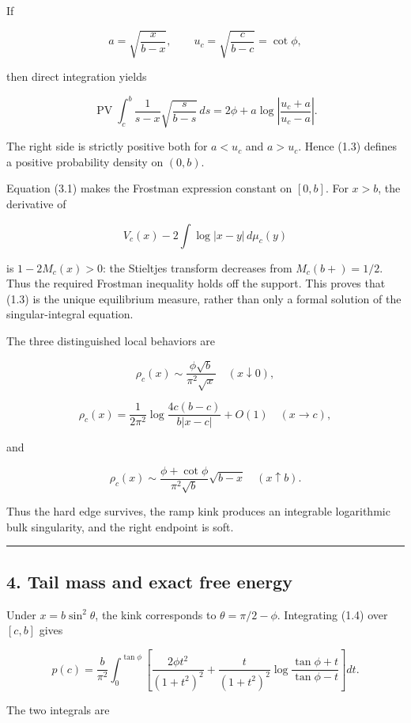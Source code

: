 \documentclass[11pt]{article}
\theoremstyle{keio}
\theoremstyle{definition}
\theoremstyle{remark}
\begin{document}
If

\[
a=\sqrt{\frac{x}{b-x}},\qquad u_c=\sqrt{\frac{c}{b-c}}=\cot\phi,
\]

then direct integration yields

\[
\operatorname{PV}\!\int_c^b
\frac1{s-x}\sqrt{\frac{s}{b-s}}\,ds
=2\phi+a\log\left|\frac{u_c+a}{u_c-a}\right|. \tag{DS-3.7}
\]

The right side is strictly positive both for \(a<u_c\) and \(a>u_c\).
Hence (1.3) defines a positive probability density on \((0,b)\).

Equation (3.1) makes the Frostman expression constant on \([0,b]\). For
\(x>b\), the derivative of

\[
V_c(x)-2\int\log|x-y|\,d\mu_c(y)
\]

is \(1-2M_c(x)>0\): the Stieltjes transform decreases from
\(M_c(b+)=1/2\). Thus the required Frostman inequality holds off the support.
This proves that (1.3) is the unique equilibrium measure, rather than only a
formal solution of the singular-integral equation.

The three distinguished local behaviors are

\[
\rho_c(x)\sim\frac{\phi\sqrt b}{\pi^2\sqrt x}
\quad(x\downarrow0), \tag{DS-3.8}
\]

\[
\rho_c(x)=\frac1{2\pi^2}
\log\frac{4c(b-c)}{b|x-c|}+O(1)
\quad(x\to c), \tag{DS-3.9}
\]

and

\[
\rho_c(x)\sim
\frac{\phi+\cot\phi}{\pi^2\sqrt b}\sqrt{b-x}
\quad(x\uparrow b). \tag{DS-3.10}
\]

Thus the hard edge survives, the ramp kink produces an integrable logarithmic
bulk singularity, and the right endpoint is soft.

\begin{center}\rule{0.5\linewidth}{0.5pt}\end{center}

\subsection{4. Tail mass and exact free energy}

Under \(x=b\sin^2\theta\), the kink corresponds to
\(\theta=\pi/2-\phi\). Integrating (1.4) over \([c,b]\) gives

\[
p(c)=\frac{b}{\pi^2}
\int_0^{\tan\phi}
\left[
\frac{2\phi t^2}{(1+t^2)^2}
+\frac{t}{(1+t^2)^2}
\log\frac{\tan\phi+t}{\tan\phi-t}
\right]dt. \tag{DS-4.1}
\]

The two integrals are
\end{document}
